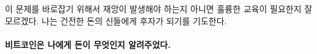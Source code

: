 \begin{comment}
If it will take a series of catastrophes or simply a monumental
educational effort to correct this corruption remains to be seen. I pray
to the gods of sound money that it will be the latter.
\end{comment}
이 문제를 바로잡기 위해서 재앙이 발생해야 하는지 아니면 훌륭한 교육이 필요한지 잘 모르겠다. 
나는 건전한 돈의 신들에게 후자가 되기를 기도한다. 

\paragraph{비트코인은 나에게 돈이 무엇인지 알려주었다.}

%
%
%
%
